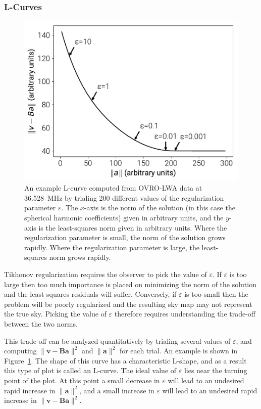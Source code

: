\documentclass[twocolumn]{aastex61}
\renewcommand{\b}{\pmb}
\begin{document}
\subsubsection{L-Curves}

\begin{figure}[t]
    \includegraphics[width=\columnwidth]{figures/lcurve/lcurve}
    \caption{
        An example L-curve computed from OVRO-LWA data at 36.528~MHz by trialing 200 different
        values of the regularization parameter $\varepsilon$. The $x$-axis is the norm of the
        solution (in this case the spherical harmonic coefficients) given in arbitrary units, and
        the $y$-axis is the least-squares norm given in arbitrary units. Where the regularization
        parameter is small, the norm of the solution grows rapidly. Where the regularization
        parameter is large, the least-squares norm grows rapidly.
    }
    \label{fig:lcurve}
\end{figure}

Tikhonov regularization requires the observer to pick the value of $\varepsilon$. If $\varepsilon$
is too large then too much importance is placed on minimizing the norm of the solution and the
least-squares residuals will suffer. Conversely, if $\varepsilon$ is too small then the problem will
be poorly regularized and the resulting sky map may not represent the true sky. Picking the value of
$\varepsilon$ therefore requires understanding the trade-off between the two norms.

This trade-off can be analyzed quantitatively by trialing several values of $\varepsilon$, and
computing $\|\b v - \b B\b a\|^2$ and $\|\b a\|^2$ for each trial. An example is shown in
Figure~\ref{fig:lcurve}. The shape of this curve has a characteristic L-shape, and as a result this
type of plot is called an L-curve. The ideal value of $\varepsilon$ lies near the turning point of
the plot. At this point a small decrease in $\varepsilon$ will lead to an undesired rapid increase
in $\|\b a\|^2$, and a small increase in $\varepsilon$ will lead to an undesired rapid increase in
$\|\b v - \b B\b a\|^2$.
\end{document}
